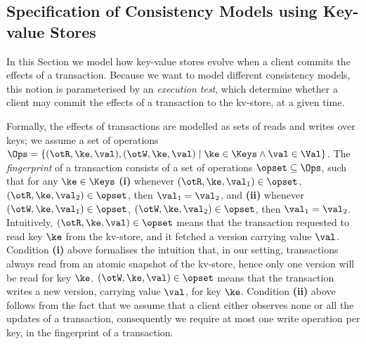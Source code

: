 \subsection{Specification of Consistency Models using Key-value Stores}
\label{sec:execution.tests}

In this Section we model how key-value stores evolve when a client commits 
the effects of a transaction. Because we want to model different consistency models, 
this notion is parameterised by an \emph{execution test}, which determine whether 
a client may commit the effects of a transaction to the kv-store, at a given time.

Formally, the effects of transactions are modelled as sets of reads and writes 
over keys; we assume a set of operations $\Ops = \{(\otR, \ke, \val), (\otW, \ke, \val) \mid \ke \in \Keys \wedge 
\val \in \Val \}$. The \emph{fingerprint} of a transaction consists of a 
set of operations $\opset \subseteq \Ops$, such that for any $\ke \in \Keys$ 
\textbf{(i)} whenever $(\otR, \ke, \val_1) \in \opset$, $(\otR, \ke, \val_2) \in \opset$, then $\val_1 = \val_2$, 
and \textbf{(ii)} whenever $(\otW, \ke, \val_1) \in \opset$, $(\otW, \ke, \val_2) \in \opset$, then $\val_1 = \val_2$. 
Intuitively, $(\otR, \ke, \val) \in \opset$ means that the transaction requested to read key $\ke$ from the kv-store, 
and it fetched a version carrying value $\val$. Condition \textbf{(i)} above formalises the intuition that, in our setting, 
transactions always read from an atomic snapshot of the kv-store, hence only one version will be read for key $\ke$. 
$(\otW, \ke, \val) \in \opset$ means that the transaction writes a new version, carrying value $\val$, for key $\ke$. 
Condition \textbf{(ii)} above follows from the fact that we assume that a client either observes none or all the updates 
of a transaction, consequently we require at most one write operation per key, in the fingerprint of a transaction. 



